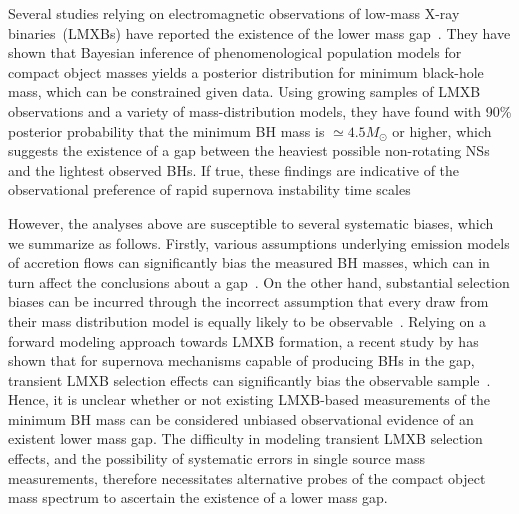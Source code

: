 \documentclass[modern]{aastex631}
\begin{document}
Several studies relying on electromagnetic observations of low-mass X-ray binaries~(LMXBs) have reported the existence of the lower mass gap~\citep{Bailyn:1997xt, Ozel:2010su, Farr:2010tu}. They have shown that Bayesian inference of phenomenological population models for compact object masses yields a posterior distribution for minimum black-hole mass, which can be constrained given data. Using growing samples of LMXB observations and a variety of mass-distribution models, they have found with 90\% posterior probability that the minimum BH mass is $\simeq 4.5M_{\odot}$ or higher, which suggests the existence of a gap between the heaviest possible non-rotating NSs~\citep[$2-3M_{\odot}$,][]{PhysRevLett.32.324, Kalogera:1996ci, Mueller:1996pm, Ozel:2016oaf, Margalit_2017, Ai:2019rre, Shao:2020bzt, Raaijmakers:2021uju} and the lightest observed BHs. If true, these findings are indicative of the observational preference of rapid supernova instability time scales~\citep[$\sim 10 ms$,][]{Fryer:2011cx, Belczynski:2011bn, Fryer:2022lla, Siegel:2022gwc} %

However, the analyses above are susceptible to several systematic biases, which we summarize as follows. Firstly, various assumptions underlying emission models of accretion flows can significantly bias the measured BH masses, which can in turn affect the conclusions about a gap~\citep{Kreidberg:2012ud}. On the other hand, substantial selection biases can be incurred through the incorrect assumption that every draw from their mass distribution model is equally likely to be observable~\citep{Farr:2010tu, Siegel:2022gwc}. Relying on a forward modeling approach towards LMXB formation, a recent study by \cite{Siegel:2022gwc} has shown that for supernova mechanisms capable of producing BHs in the gap, transient LMXB selection effects can significantly bias the observable sample~\citep[see also, for example, ][ for similar effects of selection biases in high mass X-ray binary populations]{Liotine2023}. Hence, it is unclear whether or not existing LMXB-based measurements of the minimum BH mass can be considered unbiased observational evidence of an existent lower mass gap. The difficulty in modeling transient LMXB selection effects, and the possibility of systematic errors in single source mass measurements, therefore necessitates alternative probes of the compact object mass spectrum to ascertain the existence of a lower mass gap.
\end{document}
